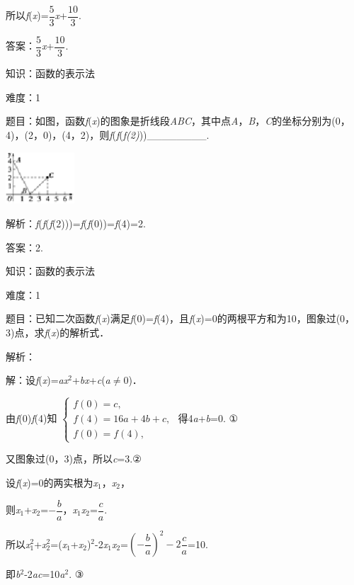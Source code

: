 \documentclass{article} %
\begin{document}
所以\textit{f}(\textit{x})=$\dfrac{5}{3}$\textit{x}+$\dfrac{10}{3}$.

答案：$\dfrac{5}{3}$\textit{x}+$\dfrac{10}{3}$.

知识：函数的表示法

难度：1

题目：如图，函数\textit{f}(\textit{x})的图象是折线段\textit{ABC}，其中点\textit{A}，\textit{B}，\textit{C}的坐标分别为(0，4)，(2，0)，(4，2)，则\textit{f}(\textit{f}(\textit{f(2)}))\_\_\_\_\_\_\_\_.

\includegraphics*[width=1.01in, height=0.76in, keepaspectratio=false]{image26}

解析：\textit{f}(\textit{f}(\textit{f}(2)))=\textit{f}(\textit{f}(0))=\textit{f}(4)=2.

答案：2.

知识：函数的表示法

难度：1

题目：已知二次函数\textit{f}(\textit{x})满足\textit{f}(0)=\textit{f}(4)，且\textit{f}(\textit{x})=0的两根平方和为10，图象过(0，3)点，求\textit{f}(\textit{x})的解析式．

解析：

解：设\textit{f}(\textit{x})=\textit{ax}${}^{2}$+\textit{bx}+\textit{c}(\textit{a}$\mathrm{\neq}$0)．

由\textit{f}(0)\textit{f}(4)知
$\left\{
\begin{array}{l}
	f(0)=c,\\
	f(4)=16a+4b+c,\\
	f(0)=f(4),
\end{array}
\right.$
得4\textit{a}+\textit{b}=0. ①

又图象过(0，3)点，所以\textit{c}=3.②

设\textit{f}(\textit{x})=0的两实根为\textit{x}${}_{1}$，\textit{x}${}_{2}$，

则\textit{x}${}_{1}$+\textit{x}${}_{2}$=$-\dfrac{b}{a}$，\textit{x}${}_{1}$\textit{x}${}_{2}$=$\dfrac{c}{a}$.

所以\textit{x}${}_{1}^{2}$+\textit{x}${}_{2}^{2}$=(\textit{x}${}_{1}$+\textit{x}${}_{2}$)${}^{2}$-2\textit{x}${}_{1}$\textit{x}${}_{2}$=$(-\dfrac{b}{a})^{2}-2\dfrac{c}{a}$=10.

即\textit{b}${}^{2}$-2\textit{ac}=10\textit{a}${}^{2}$. ③
\end{document}
